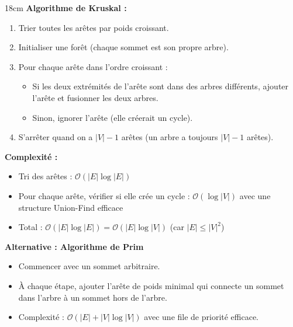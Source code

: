 \begin{parts}
\begin{solutionbox}{18cm}
        \textbf{Algorithme de Kruskal :}
        \begin{enumerate}
            \item Trier toutes les arêtes par poids croissant.
            \item Initialiser une forêt (chaque sommet est son propre arbre).
            \item Pour chaque arête dans l'ordre croissant :
            \begin{itemize}
                \item Si les deux extrémités de l'arête sont dans des arbres différents, ajouter l'arête et fusionner les deux arbres.
                \item Sinon, ignorer l'arête (elle créerait un cycle).
            \end{itemize}
            \item S'arrêter quand on a $|V| - 1$ arêtes (un arbre a toujours $|V| - 1$ arêtes).
        \end{enumerate}
        
        \textbf{Complexité :} 
        \begin{itemize}
            \item Tri des arêtes : $\mathcal{O}(|E| \log |E|)$
            \item Pour chaque arête, vérifier si elle crée un cycle : $\mathcal{O}(\log |V|)$ avec une structure Union-Find efficace
            \item Total : $\mathcal{O}(|E| \log |E|) = \mathcal{O}(|E| \log |V|)$ (car $|E| \leq |V|^2$)
        \end{itemize}
        
        \textbf{Alternative : Algorithme de Prim}
        \begin{itemize}
            \item Commencer avec un sommet arbitraire.
            \item À chaque étape, ajouter l'arête de poids minimal qui connecte un sommet dans l'arbre à un sommet hors de l'arbre.
            \item Complexité : $\mathcal{O}(|E| + |V|\log|V|)$ avec une file de priorité efficace.
        \end{itemize}
    \end{solutionbox}
\end{parts}
